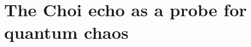 \documentclass[pra,twocolumn,aps,showpacs,superscriptaddress,longbibliography]{revtex4-2}
\begin{document}
\section{The Choi echo as a probe for quantum chaos}\label{sec:chaos_probe}
%
\end{document}

